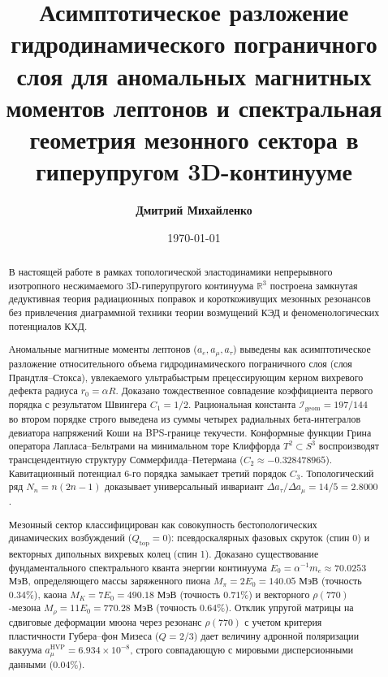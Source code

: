 \documentclass[12pt,a4paper]{article}
\title{\textbf{Асимптотическое разложение гидродинамического пограничного слоя для аномальных магнитных моментов лептонов и спектральная геометрия мезонного сектора в гиперупругом 3D-континууме}}
\author{\textbf{Дмитрий Михайленко}}
\date{\today}
\begin{document}
	
	\maketitle
	
	\begin{abstract}
		В настоящей работе в рамках топологической эластодинамики непрерывного изотропного несжимаемого 3D-гиперупругого континуума $\mathbb{R}^3$ построена замкнутая дедуктивная теория радиационных поправок и короткоживущих мезонных резонансов без привлечения диаграммной техники теории возмущений КЭД и феноменологических потенциалов КХД. 
		
		Аномальные магнитные моменты лептонов ($a_e, a_\mu, a_\tau$) выведены как асимптотическое разложение относительного объема гидродинамического пограничного слоя (слоя Прандтля--Стокса), увлекаемого ультрабыстрым прецессирующим керном вихревого дефекта радиуса $r_0 = \alpha R$. Доказано тождественное совпадение коэффициента первого порядка с результатом Швингера $C_1 = 1/2$. Рациональная константа $\mathcal{I}_{\text{geom}} = 197/144$ во втором порядке строго выведена из суммы четырех радиальных бета-интегралов девиатора напряжений Коши на BPS-границе текучести. Конформные функции Грина оператора Лапласа--Бельтрами на минимальном торе Клиффорда $T^2 \subset S^3$ воспроизводят трансцендентную структуру Соммерфилда--Петермана ($C_2 \approx -0.328478965$). Кавитационный потенциал 6-го порядка замыкает третий порядок $C_3$. Топологический ряд $N_n = n(2n-1)$ доказывает универсальный инвариант $\Delta a_\tau / \Delta a_\mu = 14/5 = 2.8000$.
		
		Мезонный сектор классифицирован как совокупность бестопологических динамических возбуждений ($Q_{\text{top}} = 0$): псевдоскалярных фазовых скруток (спин 0) и векторных дипольных вихревых колец (спин 1). Доказано существование фундаментального спектрального кванта энергии континуума $E_0 = \alpha^{-1} m_e \approx 70.0253$ МэВ, определяющего массы заряженного пиона $M_\pi = 2 E_0 = 140.05$ МэВ (точность $0.34\%$), каона $M_K = 7 E_0 = 490.18$ МэВ (точность $0.71\%$) и векторного $\rho(770)$-мезона $M_\rho = 11 E_0 = 770.28$ МэВ (точность $0.64\%$). Отклик упругой матрицы на сдвиговые деформации мюона через резонанс $\rho(770)$ с учетом критерия пластичности Губера--фон Мизеса ($Q = 2/3$) дает величину адронной поляризации вакуума $a_\mu^{\text{HVP}} = 6.934 \times 10^{-8}$, строго совпадающую с мировыми дисперсионными данными ($0.04\%$).
	\end{abstract}
	
	\newpage
	
\end{document}
